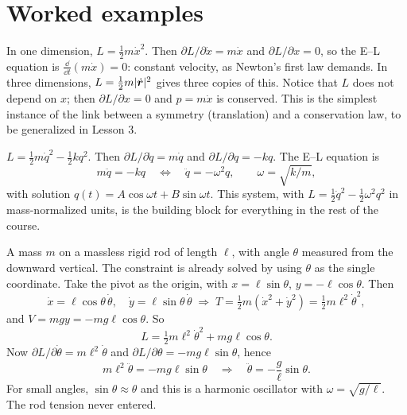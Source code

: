 \documentclass[11pt]{article}
\begin{document}
\section{Worked examples}

\begin{example}
In one dimension, $L=\tfrac12m\dot x^2$. Then $\partial L/\partial\dot x=m\dot x$ and $\partial L/\partial x=0$, so the E--L equation is $\frac{\dd}{\dd t}(m\dot x)=0$: constant velocity, as Newton's first law demands. In three dimensions, $L=\tfrac12m|\dot{\bm{r}}|^2$ gives three copies of this. Notice that $L$ does not depend on $x$; then $\partial L/\partial x=0$ and $p=m\dot x$ is conserved. This is the simplest instance of the link between a symmetry (translation) and a conservation law, to be generalized in Lesson 3.
\end{example}

\begin{example}
$L=\tfrac12m\dot q^2-\tfrac12kq^2$. Then $\partial L/\partial\dot q=m\dot q$ and $\partial L/\partial q=-kq$. The E--L equation is
\begin{equation}
  m\ddot q=-kq\quad\Longleftrightarrow\quad\ddot q=-\omega^2q,\qquad \omega=\sqrt{k/m},
\end{equation}
with solution $q(t)=A\cos\omega t+B\sin\omega t$. This system, with $L=\tfrac12\dot q^2-\tfrac12\omega^2q^2$ in mass-normalized units, is the building block for everything in the rest of the course.
\end{example}

\begin{example}
A mass $m$ on a massless rigid rod of length $\ell$, with angle $\theta$ measured from the downward vertical. The constraint is already solved by using $\theta$ as the single coordinate. Take the pivot as the origin, with $x=\ell\sin\theta$, $y=-\ell\cos\theta$. Then
\[
 \dot x=\ell\cos\theta\,\dot\theta,\quad \dot y=\ell\sin\theta\,\dot\theta
 \;\Rightarrow\; T=\tfrac12m(\dot x^2+\dot y^2)=\tfrac12m\ell^2\dot\theta^2,
\]
and $V=mgy=-mg\ell\cos\theta$. So
\begin{equation}
  L=\tfrac12m\ell^2\dot\theta^2+mg\ell\cos\theta .
\end{equation}
Now $\partial L/\partial\dot\theta=m\ell^2\dot\theta$ and $\partial L/\partial\theta=-mg\ell\sin\theta$, hence
\begin{equation}
  m\ell^2\ddot\theta=-mg\ell\sin\theta\quad\Longrightarrow\quad\ddot\theta=-\frac g\ell\sin\theta .
\end{equation}
For small angles, $\sin\theta\approx\theta$ and this is a harmonic oscillator with $\omega=\sqrt{g/\ell}$. The rod tension never entered.
\end{example}
\end{document}
